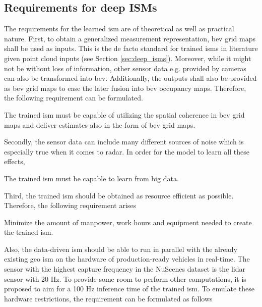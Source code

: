\subsection{Requirements for deep ISMs}
\label{subsec:requirements_for_ev_representation}
The requirements for the learned \gls{ism} are of theoretical as well as practical nature. First, to obtain a generalized measurement representation, \gls{bev} grid maps shall be used as inputs. This is the de facto standard for trained \gls{ism}s in literature given point cloud inputs (see Section \ref{sec:deep_isms}). Moreover, while it might not be without loss of information, other sensor data e.g. provided by cameras can also be transformed into \gls{bev}. Additionally, the outputs shall also be provided as \gls{bev} grid maps to ease the later fusion into \gls{bev} occupancy maps. Therefore, the following requirement can be formulated.
\\
\setcounter{req}{1}
\setcounter{subreq}{0}
\begin{subreq} \label{subreq:input_output}
	The trained \gls{ism} must be capable of utilizing the spatial coherence in \gls{bev} grid maps and deliver estimates also in the form of \gls{bev} grid maps.
\end{subreq}
Secondly, the sensor data can include many different sources of noise which is especially true when it comes to radar. In order for the model to learn all these effects, 
\\
\begin{subreq} \label{subreq:big_data}
	The trained \gls{ism} must be capable to learn from big data.
\end{subreq}
Third, the trained \gls{ism} should be obtained as resource efficient as possible. Therefore, the following requirement arises
\\
\begin{subreq} \label{subreq:min_requirements}
	Minimize the amount of manpower, work hours and equipment needed to create the trained \gls{ism}.
\end{subreq}
Also, the data-driven \gls{ism} should be able to run in parallel with the already existing geo \gls{ism} on the hardware of production-ready vehicles in real-time. The sensor with the highest capture frequency in the NuScenes dataset is the lidar sensor with 20 Hz. To provide some room to perform other computations, it is proposed to aim for a 100 Hz inference time of the trained \gls{ism}. To emulate these hardware restrictions, the requirement can be formulated as follows
